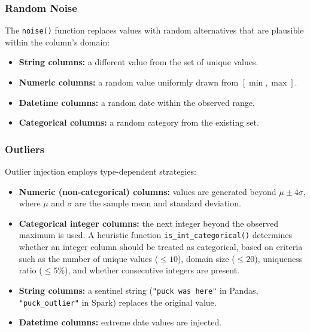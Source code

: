 \documentclass[../main.tex]{subfiles}
\begin{document}
\subsubsection{Random Noise}\label{sec:noise}

The \texttt{noise()} function replaces values with random alternatives
that are plausible within the column's domain:

\begin{itemize}
  \item \textbf{String columns:}  a different value from the set of unique
    values.
  \item \textbf{Numeric columns:}  a random value uniformly drawn from
    $[\min, \max]$.
  \item \textbf{Datetime columns:}  a random date within the observed
    range.
  \item \textbf{Categorical columns:}  a random category from the existing
    set.
\end{itemize}

\subsubsection{Outliers}\label{sec:outliers}

Outlier injection employs type-dependent strategies:

\begin{itemize}
  \item \textbf{Numeric (non-categorical) columns:}  values are generated
    beyond $\mu \pm 4\sigma$, where $\mu$ and $\sigma$ are the sample mean
    and standard deviation.
  \item \textbf{Categorical integer columns:}  the next integer beyond the
    observed maximum is used.  A heuristic function
    \texttt{is\_int\_categorical()} determines whether an integer column
    should be treated as categorical, based on criteria such as the number
    of unique values ($\leq 10$), domain size ($\leq 20$), uniqueness
    ratio ($\leq 5\%$), and whether consecutive integers are present.
  \item \textbf{String columns:}  a sentinel string
    (\texttt{"puck was here"} in Pandas, \texttt{"puck\_outlier"} in
    Spark) replaces the original value.
  \item \textbf{Datetime columns:}  extreme date values are injected.
\end{itemize}



\newpage
\end{document}
